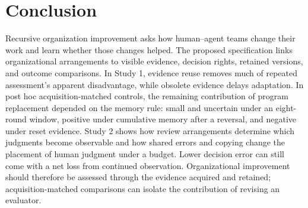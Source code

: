 \section{Conclusion}
Recursive organization improvement asks how human--agent teams change their work and learn whether those changes helped. The proposed specification links organizational arrangements to visible evidence, decision rights, retained versions, and outcome comparisons. In Study 1, evidence reuse removes much of repeated assessment's apparent disadvantage, while obsolete evidence delays adaptation. In post hoc acquisition-matched controls, the remaining contribution of program replacement depended on the memory rule: small and uncertain under an eight-round window, positive under cumulative memory after a reversal, and negative under reset evidence. Study 2 shows how review arrangements determine which judgments become observable and how shared errors and copying change the placement of human judgment under a budget. Lower decision error can still come with a net loss from continued observation. Organizational improvement should therefore be assessed through the evidence acquired and retained; acquisition-matched comparisons can isolate the contribution of revising an evaluator.
